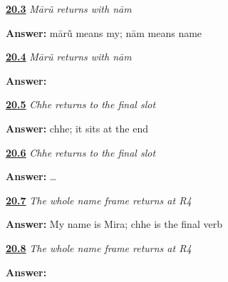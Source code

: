 \noindent\begin{minipage}[t]{\linewidth}
\raggedright
\hyperlink{review-GU-R16-maarun-r4-listening}{\textbf{20.3}} \emph{Mārũ returns with nām}\par
\small \textbf{Answer:} mārũ means my; nām means name\par
\end{minipage}\par\medskip

\noindent\begin{minipage}[t]{\linewidth}
\raggedright
\hyperlink{review-GU-R16-maarun-r4-writing}{\textbf{20.4}} \emph{Mārũ returns with nām}\par
\small \textbf{Answer:}  \par
\end{minipage}\par\medskip

\noindent\begin{minipage}[t]{\linewidth}
\raggedright
\hyperlink{review-GU-R16-chhe-r4-listening}{\textbf{20.5}} \emph{Chhe returns to the final slot}\par
\small \textbf{Answer:} chhe; it sits at the end\par
\end{minipage}\par\medskip

\noindent\begin{minipage}[t]{\linewidth}
\raggedright
\hyperlink{review-GU-R16-chhe-r4-writing}{\textbf{20.6}} \emph{Chhe returns to the final slot}\par
\small \textbf{Answer:}  … \par
\end{minipage}\par\medskip

\noindent\begin{minipage}[t]{\linewidth}
\raggedright
\hyperlink{review-GU-R16-my-name-is-r4-listening}{\textbf{20.7}} \emph{The whole name frame returns at R4}\par
\small \textbf{Answer:} My name is Mira; chhe is the final verb\par
\end{minipage}\par\medskip

\noindent\begin{minipage}[t]{\linewidth}
\raggedright
\hyperlink{review-GU-R16-my-name-is-r4-writing}{\textbf{20.8}} \emph{The whole name frame returns at R4}\par
\small \textbf{Answer:}    \par
\end{minipage}\par\medskip


